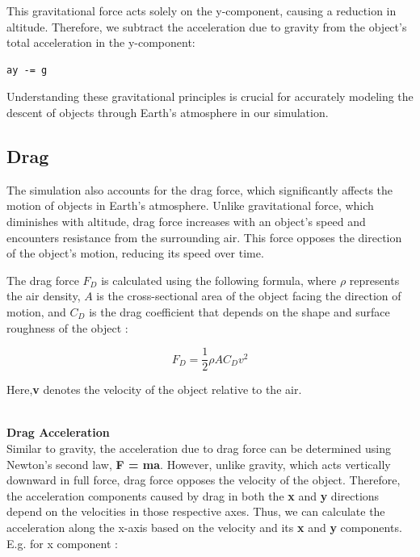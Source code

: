 \documentclass[runningheads]{llncs}
\begin{document}
This gravitational force acts solely on the y-component, causing a reduction in altitude. Therefore, we subtract the acceleration due to gravity from the object's total acceleration in the y-component:

\begin{verbatim}
ay -= g
\end{verbatim}

Understanding these gravitational principles is crucial for accurately modeling the descent of objects through Earth's atmosphere in our simulation.




\subsection{Drag}
The simulation also accounts for the drag force, which significantly affects the motion of objects in Earth's atmosphere. Unlike gravitational force, which diminishes with altitude, drag force increases with an object's speed and encounters resistance from the surrounding air. This force opposes the direction of the object's motion, reducing its speed over time.

The drag force \( F_D \) is calculated using the following formula, where \( \rho \) represents the air density, \( A \) is the cross-sectional area of the object facing the direction of motion, and \( C_D \) is the drag coefficient that depends on the shape and surface roughness of the object \cite{gallais_mechanics}:

\begin{equation}
F_D = \frac{1}{2} \rho A C_D v^2 
\end{equation}

Here,\textbf{v} denotes the velocity of the object relative to the air.

\textbf{\\Drag Acceleration\\}
Similar to gravity, the acceleration due to drag force can be determined using Newton's second law, 
\textbf{F = ma}. However, unlike gravity, which acts vertically downward in full force, drag force opposes the velocity of the object. Therefore, the acceleration components caused by drag in both the \textbf{x} and \textbf{y} directions depend on the velocities in those respective axes.
Thus, we can calculate the acceleration along the x-axis based on the velocity and its \textbf{x} and \textbf{y} components. E.g. for x component \cite{chapman_analysis}:
\end{document}
